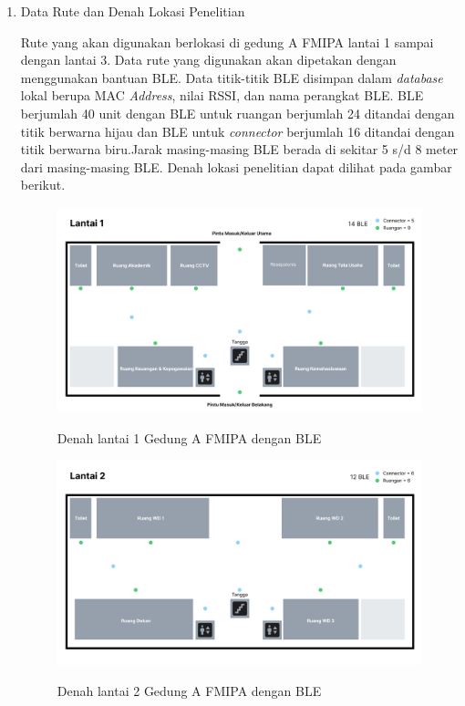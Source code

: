 \begin{enumerate}
	\item Data Rute dan Denah Lokasi Penelitian
	\par Rute yang akan digunakan berlokasi di gedung A FMIPA lantai 1 sampai dengan lantai 3. Data rute yang digunakan akan dipetakan dengan menggunakan bantuan BLE. Data titik-titik BLE disimpan dalam \textit{database} lokal berupa MAC \textit{Address}, nilai RSSI, dan nama perangkat BLE. BLE berjumlah 40 unit dengan BLE untuk ruangan berjumlah 24 ditandai dengan titik berwarna hijau dan BLE untuk \textit{connector} berjumlah 16 ditandai dengan titik berwarna biru.Jarak masing-masing BLE berada di sekitar 5 s/d 8 meter dari masing-masing BLE. Denah lokasi penelitian dapat dilihat pada gambar berikut.
	
	\begin{figure}[H]
\centering
{\includegraphics [scale = 0.2]{gambar/bab4/Denah-1-BLE}}
\caption{Denah lantai 1 Gedung A FMIPA dengan BLE}
\label{img:denah_1_ble}
\end{figure}

\begin{figure}[H]
\centering
{\includegraphics [scale = 0.2]{gambar/bab4/Denah-2-BLE}}
\caption{Denah lantai 2 Gedung A FMIPA dengan BLE}
\label{img:denah_2_ble}
\end{figure}


\end{enumerate}

